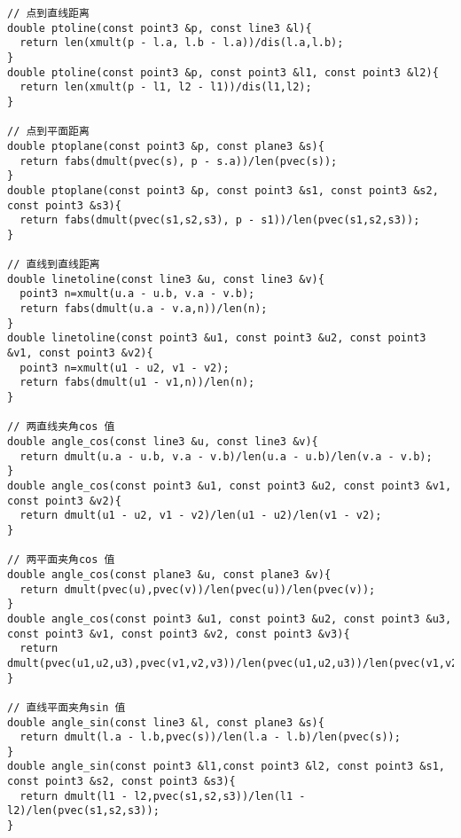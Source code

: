\begin{lstlisting}[language={}]
// 点到直线距离
double ptoline(const point3 &p, const line3 &l){
  return len(xmult(p - l.a, l.b - l.a))/dis(l.a,l.b);
}
double ptoline(const point3 &p, const point3 &l1, const point3 &l2){
  return len(xmult(p - l1, l2 - l1))/dis(l1,l2);
}

// 点到平面距离
double ptoplane(const point3 &p, const plane3 &s){
  return fabs(dmult(pvec(s), p - s.a))/len(pvec(s));
}
double ptoplane(const point3 &p, const point3 &s1, const point3 &s2, const point3 &s3){
  return fabs(dmult(pvec(s1,s2,s3), p - s1))/len(pvec(s1,s2,s3));
}

// 直线到直线距离
double linetoline(const line3 &u, const line3 &v){
  point3 n=xmult(u.a - u.b, v.a - v.b);
  return fabs(dmult(u.a - v.a,n))/len(n);
}
double linetoline(const point3 &u1, const point3 &u2, const point3 &v1, const point3 &v2){
  point3 n=xmult(u1 - u2, v1 - v2);
  return fabs(dmult(u1 - v1,n))/len(n);
}

// 两直线夹角cos 值
double angle_cos(const line3 &u, const line3 &v){
  return dmult(u.a - u.b, v.a - v.b)/len(u.a - u.b)/len(v.a - v.b);
}
double angle_cos(const point3 &u1, const point3 &u2, const point3 &v1, const point3 &v2){
  return dmult(u1 - u2, v1 - v2)/len(u1 - u2)/len(v1 - v2);
}

// 两平面夹角cos 值
double angle_cos(const plane3 &u, const plane3 &v){
  return dmult(pvec(u),pvec(v))/len(pvec(u))/len(pvec(v));
}
double angle_cos(const point3 &u1, const point3 &u2, const point3 &u3, const point3 &v1, const point3 &v2, const point3 &v3){
  return dmult(pvec(u1,u2,u3),pvec(v1,v2,v3))/len(pvec(u1,u2,u3))/len(pvec(v1,v2,v3));
}

// 直线平面夹角sin 值
double angle_sin(const line3 &l, const plane3 &s){
  return dmult(l.a - l.b,pvec(s))/len(l.a - l.b)/len(pvec(s));
}
double angle_sin(const point3 &l1,const point3 &l2, const point3 &s1, const point3 &s2, const point3 &s3){
  return dmult(l1 - l2,pvec(s1,s2,s3))/len(l1 - l2)/len(pvec(s1,s2,s3));
}
\end{lstlisting}
